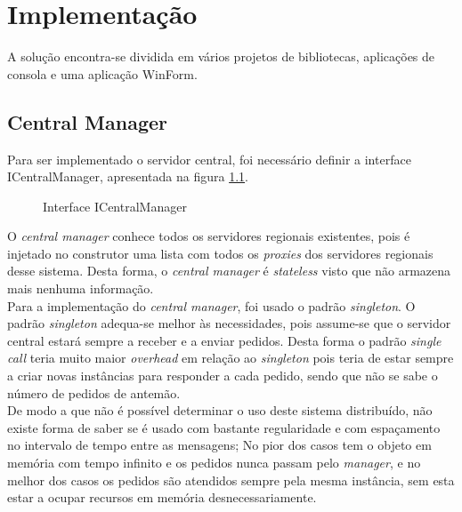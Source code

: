 \chapter{Implementação}

A solução encontra-se dividida em vários projetos de bibliotecas, aplicações de consola e uma aplicação WinForm. 

\section{Central Manager} \label{seccentralmanager}

Para ser implementado o servidor central, foi necessário definir a interface ICentralManager, apresentada na figura \ref{icentralmanager}.\\ 

\begin{figure}[h]
	\caption{Interface ICentralManager}
	\label{icentralmanager}
\end{figure}

O \textit{central manager} conhece todos os servidores regionais existentes, pois é injetado no construtor uma lista com todos os \textit{proxies} dos servidores regionais desse sistema. Desta forma, o \textit{central manager} é \textit{stateless} visto que não armazena mais nenhuma informação.\\

Para a implementação do \textit{central manager}, foi usado o padrão \textit{singleton}. O padrão \textit{singleton} adequa-se melhor às necessidades, pois assume-se que o servidor central estará sempre a receber e a enviar pedidos. Desta forma o padrão \textit{single call} teria muito maior \textit{overhead} em relação ao \textit{singleton} pois teria de estar sempre a criar novas instâncias para responder a cada pedido, sendo que não se sabe o número de pedidos de antemão.\\

De modo a que não é possível determinar o uso deste sistema distribuído, não existe forma de saber se é usado com bastante regularidade e com espaçamento no intervalo de tempo entre as mensagens; No pior dos casos tem o objeto em memória com tempo infinito e os pedidos nunca passam pelo \textit{manager}, e no melhor dos casos os pedidos são atendidos sempre pela mesma instância, sem esta estar a ocupar recursos em memória desnecessariamente.\\

